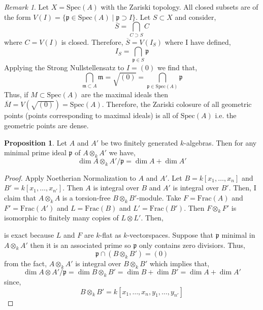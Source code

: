 \documentclass[12pt]{article}
\newcommand{\Frac}[1]{\mathrm{Frac}\left(#1\right)}
\newcommand{\Spec}[1]{\mathrm{Spec}\left( #1 \right)}
\newcommand{\p}{\mathfrak{p}}
\newcommand{\m}{\mathfrak{m}}
\theoremstyle{remark}
\newtheorem*{remark}{Remark}
\theoremstyle{definition}
\newtheorem{proposition}[theorem]{Proposition}
\begin{document}
\begin{remark}
Let $X = \Spec{A}$ with the Zariski topology. All closed subsets are of the form $V(I) = \{ \p \in \Spec{A} \mid \p \supset I \}$. Let $S \subset X$ and consider,
\[ \overline{S} = \bigcap_{C \supset S} C \]
where $C = V(I)$ is closed. Therefore, $\overline{S} = V(I_S)$ where I have defined,
\[ I_S = \bigcap_{\p \in S} \p \]
Applying the Strong Nullstellensatz to $I = (0)$ we find that,
\[ \bigcap_{\m \subset A} \m = \sqrt{(0)} = \bigcap_{\p \in \Spec{A}} \p \]
Thus, if $M \subset \Spec{A}$ are the maximal ideals then $\overline{M} = V(\sqrt{(0)}) = \Spec{A}$. 
Therefore, the Zariski colosure of all geometric points (points corresponding to maximal ideals) is all of $\Spec{A}$ i.e. the geometric points are dense. 
\end{remark}

\begin{proposition}
Let $A$ and $A'$ be two finitely generated $k$-algebras. Then for any minimal prime ideal $\p$ of $A \otimes_k A'$ we have,
\[ \dim{A \otimes_k A' / \p} = \dim{A} + \dim{A'} \]
\end{proposition}

\begin{proof}
Apply Noetherian Normalization to $A$ and $A'$. Let $B = k[x_1, \dots, x_n]$ and $B' = k[x_1, \dots, x_{n'}]$. Then $A$ is integral over $B$ and $A'$ is integral over $B'$. Then, I claim that $A \otimes_k A$ is a torsion-free $B \otimes_k B'$-module. Take $F = \Frac{A}$ and $F' = \Frac{A'}$ and $L = \Frac{B}$ and $L' = \Frac{B'}$. Then $F \otimes_k F'$ is isomorphic to finitely many copies of $L \otimes L'$. Then,
\begin{center}
\end{center}
is exact because $L$ and $F$ are $k$-flat as $k$-vectorspaces. 
Suppose that $\p$ minimal in $A \otimes_k A'$ then it is an associated prime so $\p$ only contains zero divisiors. Thus,
\[ \p \cap (B \otimes_k B') = (0) \]
from the fact, $A \otimes_k A'$ is integral over $B \otimes_k B'$ which implies that,
\[ \dim{A \otimes A'/\p} = \dim{B \otimes_k B'} = \dim{B} + \dim{B'} = \dim{A} + \dim{A'} \]
since,
\[ B \otimes_k B' = k[x_1, \dots, x_n, y_1, \dots, y_{n'}] \]
\end{proof}
\end{document}
